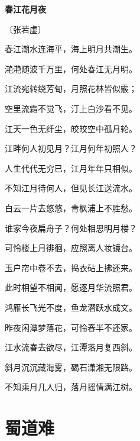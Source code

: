 \documentclass[12pt,UTF-8,openany,fontset=none]{ctexbook}
\begin{document}

\begin{center}
    {\bfseries 春江花月夜}

    \vspace{18pt}

    \begin{large}\xuwen
        〔张若虚〕
    \end{large}

\end{center}

    \vspace{10pt}  %

\begin{center}
    \begin{Large}

        春江潮水连海平，海上明月共潮生。

        滟滟随波千万里，何处春江无月明。

        江流宛转绕芳甸，月照花林皆似霰；

        空里流霜不觉飞，汀上白沙看不见。

        江天一色无纤尘，皎皎空中孤月轮。

        江畔何人初见月？江月何年初照人？

        人生代代无穷已，江月年年只相似。

        不知江月待何人，但见长江送流水。

        白云一片去悠悠，青枫浦上不胜愁。

        谁家今夜扁舟子？何处相思明月楼？

        可怜楼上月徘徊，应照离人妆镜台。

        玉户帘中卷不去，捣衣砧上拂还来。

        此时相望不相闻，愿逐月华流照君。

        鸿雁长飞光不度，鱼龙潜跃水成文。

        昨夜闲潭梦落花，可怜春半不还家。

        江水流春去欲尽，江潭落月复西斜。

        斜月沉沉藏海雾，碣石潇湘无限路。

        不知乘月几人归，落月摇情满江树。

    \end{Large}

\end{center}

\vspace{8pt}
\clearpage

\section{蜀道难}
\end{document}
